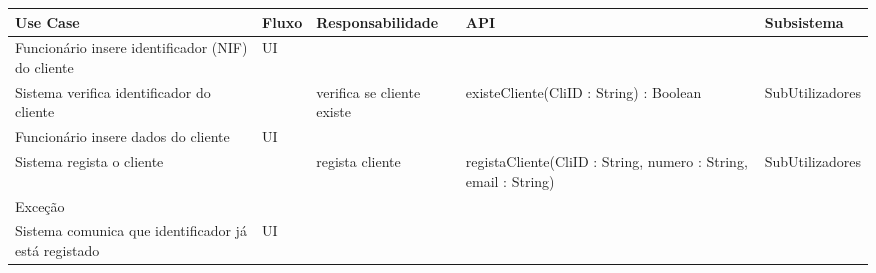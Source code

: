 \documentclass[../relatorio.tex]{subfiles}
\begin{document}
\begin{landscape}
    \begin{table}[!h]
        \centering
        \begin{tabular}{|p{5cm}|p{1cm}|p{4cm}|p{6cm}|p{3cm}|}
            \hline
            \rowcolor{gray!20!white}
            Use Case & Fluxo                                            & Responsabilidade & API & Subsistema \\
            \hline
            \rowcolor{yellow}
            Funcionário insere identificador (NIF) do cliente
                     & UI
                     & 
                     & 
                     & 
            \\
            \hline
            Sistema verifica identificador do cliente
                     & 
                     & verifica se cliente existe
                     & existeCliente(CliID : String) : Boolean
                     & SubUtilizadores
            \\
            \hline
            \rowcolor{yellow}
            Funcionário insere dados do cliente
                     & UI
                     & 
                     & 
                     & 
            \\
            \hline
            Sistema regista o cliente
                     & 
                     & regista cliente
                     & registaCliente(CliID : String, numero : String, email : String)
                     & SubUtilizadores
            \\
            \hline
            \rowcolor{red!30}
            Exceção  &                                                  &                  &     &            \\
            \hline
            Sistema comunica que identificador já está registado
                     & UI
                     & 
                     & 
                     & 
            \\
            \hline
        \end{tabular}
    \end{table}
\end{landscape}
\end{document}
